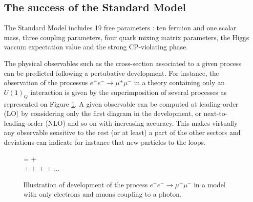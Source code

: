     \subsection{The success of the Standard Model \label{standardModelSuccess}}

    The Standard Model includes 19 free parameters : ten fermion and one scalar mass, three
    coupling parameters, four quark mixing matrix parameters, the Higgs vaccum expectation
    value and the strong CP-violating phase.

    The physical observables such as the cross-section associated to a given process
    can be predicted following a pertubative development. For instance, the observation
    of the processus $e^+ e^- \rightarrow \mu^+ \mu^-$ in a theory containing only an $U(1)_Q$
    interaction is given by the superimposition of several processes as represented on
    Figure \ref{fig:perturbativeDevelopment}. A given observable can be computed at leading-order
    (LO) by considering only the first diagram in the development, or next-to-leading-order (NLO)
    and so on with increasing accuracy. This makes virtually any observable sensitive
    to the rest (or at least) a part of the other sectors and deviations can indicate
    for instance that new particles to the loops.

    \begin{figure}
        \centering
        {
            =
            +
            \nonumber
            \\
            +
            +
            +
            +
            ...
            \nonumber
        }
        \caption{Illustration of development of the process $e^+ e^- \rightarrow \mu^+ \mu^-$
        in a model with only electrons and muons coupling to a photon. \label{fig:perturbativeDevelopment}}
    \end{figure}

